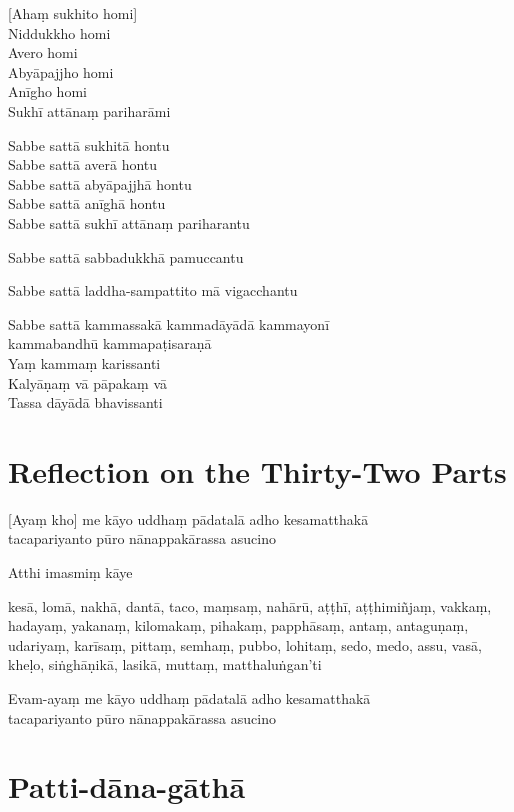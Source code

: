 \begin{leader}
\end{leader}

[Ahaṃ sukhito homi]\\
Niddukkho homi\\
Avero homi\\
Abyāpajjho homi\\
Anīgho homi\\
Sukhī attānaṃ pariharāmi

Sabbe sattā sukhitā hontu\\
Sabbe sattā averā hontu\\
Sabbe sattā abyāpajjhā hontu\\
Sabbe sattā anīghā hontu\\
Sabbe sattā sukhī attānaṃ pariharantu

Sabbe sattā sabbadukkhā pamuccantu

Sabbe sattā laddha-sampattito mā vigacchantu

Sabbe sattā kammassakā kammadāyādā kammayonī\\
\vin kammabandhū kammapaṭisaraṇā\\
Yaṃ kammaṃ karissanti\\
Kalyāṇaṃ vā pāpakaṃ vā\\
Tassa dāyādā bhavissanti

\chapter{Reflection on the Thirty-Two Parts}

\begin{leader}
\end{leader}

[Ayaṃ kho] me kāyo uddhaṃ pādatalā adho kesamatthakā\\
tacapariyanto pūro nānappakārassa asucino

Atthi imasmiṃ kāye

kesā, lomā, nakhā, dantā, taco, maṃsaṃ, nahārū, aṭṭhī, aṭṭhimiñjaṃ, vakkaṃ, hadayaṃ, yakanaṃ, kilomakaṃ, pihakaṃ, papphāsaṃ, antaṃ, antaguṇaṃ, udariyaṃ, karīsaṃ, pittaṃ, semhaṃ, pubbo, lohitaṃ, sedo, medo, assu, vasā, kheḷo, siṅghāṇikā, lasikā, muttaṃ, matthaluṅgan'ti 

Evam-ayaṃ me kāyo uddhaṃ pādatalā adho kesamatthakā\\
tacapariyanto pūro nānappakārassa asucino

\chapter{Patti-dāna-gāthā}

